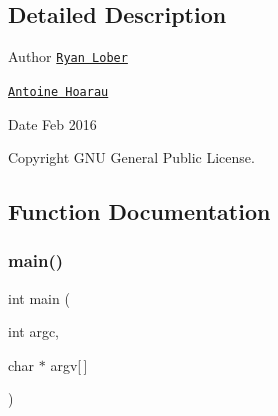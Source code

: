 \subsection{Detailed Description}
\begin{DoxyAuthor}{Author}
\href{http://www.ryanlober.com}{\tt Ryan Lober} 

\href{http://ahoarau.github.io}{\tt Antoine Hoarau} 
\end{DoxyAuthor}
\begin{DoxyDate}{Date}
Feb 2016 
\end{DoxyDate}
\begin{DoxyCopyright}{Copyright}
G\+NU General Public License. 
\end{DoxyCopyright}


\subsection{Function Documentation}
\hypertarget{example-client_8cpp_a0ddf1224851353fc92bfbff6f499fa97}{}\label{example-client_8cpp_a0ddf1224851353fc92bfbff6f499fa97} 
\subsubsection{\texorpdfstring{main()}{main()}}
{\footnotesize\ttfamily int main (\begin{DoxyParamCaption}\item[{int}]{argc,  }\item[{char $\ast$}]{argv\mbox{[}$\,$\mbox{]} }\end{DoxyParamCaption})}

